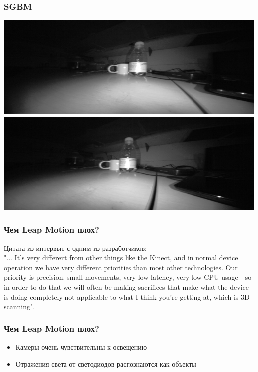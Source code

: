 \documentclass{beamer}
\begin{document}
		\begin{frame}
		    \frametitle{SGBM}
		   
		    \begin{center}
				\includegraphics[scale=0.4]{images/raw0}
				\includegraphics[scale=0.4]{images/raw1}
			\end{center}
		\end{frame}
		\begin{frame}
			\frametitle{Чем Leap Motion плох?}
			
			Цитата из интервью с одним из разработчиков:\\
			"... It’s very different from other things like the Kinect, and in normal device
			operation we have very different priorities than most other technologies.
			Our priority is precision, small movements, very low latency, very low CPU
			usage - so in order to do that we will often be making sacrifices that make
			what the device is doing completely not applicable to what I think you’re
			getting at, which is 3D scanning".
		\end{frame}
		
		\begin{frame}
			\frametitle{Чем Leap Motion плох?}
			\begin{itemize}
				\item Камеры очень чувствительны к освещению
				\item Отражения света от светодиодов распознаются как объекты
			\end{itemize}
		\end{frame}
		
\end{document}
